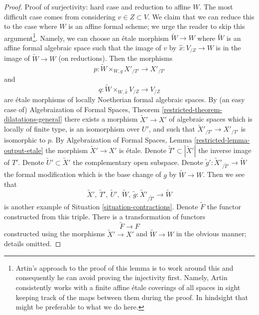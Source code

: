 \begin{proof}
\medskip\noindent
Proof of surjectivity: hard case and reduction to affine $W$.
The most difficult case comes from considering $v \in Z \subset V$.
We claim that we can reduce this to the case where $W$ is an
affine formal scheme; we urge the reader to skip this argument\footnote{Artin's
approach to the proof of this lemma is to work around this and
consequently he can avoid proving the injectivity first. Namely, Artin
consistently works with a finite affine \'etale coverings of all spaces
in sight keeping track of the maps between them during the proof.
In hindsight that might be preferable to what we do here.}.
Namely, we can choose an \'etale morphism
$\tilde W \to W$ where $\tilde W$ is an affine formal algebraic space
such that the image of $v$ by $\hat x : V_{/Z} \to W$ is
in the image of $\tilde W \to W$ (on reductions).
Then the morphisms
$$
p : \tilde W \times_{W, g} X'_{/T'} \longrightarrow X'_{/T'}
$$
and
$$
q : \tilde W \times_{W, \hat x} V_{/Z} \to V_{/Z}
$$
are \'etale morphisms of locally Noetherian formal algebraic spaces.
By (an easy case of) Algebraization of Formal Spaces, Theorem
\ref{restricted-theorem-dilatations-general}
there exists a morphism $\tilde X' \to X'$ of algebraic spaces
which is locally of finite type, is an isomorphism over $U'$, and
such that $\tilde X'_{/T'} \to X'_{/T'}$ is isomorphic to $p$.
By Algebraization of Formal Spaces, Lemma \ref{restricted-lemma-output-etale}
the morphism $\tilde X' \to X'$ is \'etale. Denote
$\tilde T' \subset |\tilde X'|$ the inverse image of $T'$.
Denote $\tilde U' \subset \tilde X'$ the complementary open subspace.
Denote $\tilde g' : \tilde X'_{/\tilde T'} \to \tilde W$
the formal modification which is the base change of $g$ by
$\tilde W \to W$. Then we see that
$$
\tilde X',\ \tilde T',\ \tilde U',\ \tilde W,
\ \tilde g : \tilde X'_{/\tilde T'} \to \tilde W
$$
is another example of Situation \ref{situation-contractions}.
Denote $\tilde F$ the functor constructed from this triple.
There is a transformation of functors
$$
\tilde F \longrightarrow F
$$
constructed using the morphisms $\tilde X' \to X'$ and
$\tilde W \to W$ in the obvious manner; details omitted.


\end{proof}
